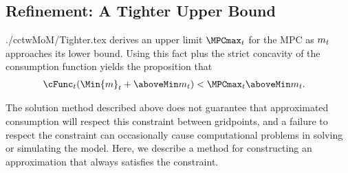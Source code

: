 \documentclass[SolvingMicroDSOPs]{subfiles}
\begin{document}
\hypertarget{refinement-a-tighter-upper-bound}{}
\subsection{Refinement: A Tighter Upper Bound}
\begin{verbatimwrite}{./cctwMoM/Tighter.tex}
  \cite{BufferStockTheory} derives an upper limit  $\MPCmax_{\prd}$ for the MPC as $m_{t}$
  approaches its lower bound.  Using this
  fact plus the strict concavity of the consumption function yields the
  proposition that
  \begin{equation}\begin{gathered}\begin{aligned}
        \cFunc_{\prd}(\Min{m}_{\prd}+\aboveMin \mNrm_{\prd}) & < \MPCmax_{\prd} \aboveMin \mNrm_{\prd}.
      \end{aligned}\end{gathered}\end{equation}

  The solution method described above does not guarantee that
  approximated consumption will respect this constraint between gridpoints, and a failure to
  respect the constraint can occasionally cause computational problems in solving
  or simulating the model.  Here, we
  describe a method for constructing an approximation that always
  satisfies the constraint.

  \begin{comment} %
    That is, the realist's consumption function is bounded from above by both
    the \textit{unconstrained} optimist's problem already treated, as well as
    by the \textit{constrained} optimist's problem, which is a 45 degree line
    originating from $\Min{m}_{\prd}$ on the $m$-axis, as shown in
    Figure~\ref{fig:IntExpFOCInvPesReaOptNeed45Plot}. The same is true for
    the value function, as illustrated in Figure
    \ref{fig:IntExpFOCInvPesReaOptNeed45ValuePlot}.

    \hypertarget{IntExpFOCInvPesReaOptNeed45Plot}{}
    \begin{figure}
      \texttt{[image: ./Figures/IntExpFOCInvPesReaOptNeed45Plot]}
      \caption{45 Degree Line as Another Upper Bound}
      \label{fig:IntExpFOCInvPesReaOptNeed45Plot}
    \end{figure}

    \hypertarget{IntExpFOCInvPesReaOptNeed45ValuePlot}{}
    \begin{figure}
      \texttt{[image: ./Figures/IntExpFOCInvPesReaOptNeed45ValuePlot]}
      \caption{A Constrained Optimist's Value Function as Another Upper Bound}
      \label{fig:IntExpFOCInvPesReaOptNeed45ValuePlot}
    \end{figure}

  \end{comment}

  \newcommand{\mtCusp}{\ensuremath{\mNrm_{\prd}^{\#}}}
\end{verbatimwrite}
\unskip
\end{document}
